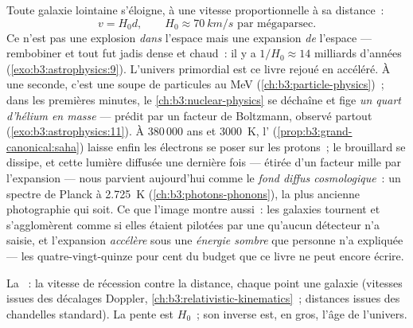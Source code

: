 \begin{definition}\label{def:b3:astrophysics:hubble}
Toute galaxie lointaine s'éloigne, à une vitesse proportionnelle à sa distance~:
\[
v = H_0d , \qquad H_0 \approx \qty{70}{km/s}
\text{ par mégaparsec} .
\]
Ce n'est pas une explosion \emph{dans} l'espace mais une expansion
\emph{de} l'espace --- rembobiner et tout fut jadis dense et chaud~:
il y a $1/H_0 \approx 14$ milliards d'années
(\cref{exo:b3:astrophysics:9}). L'univers primordial est ce livre
rejoué en accéléré. À une seconde, c'est une soupe de particules au
\unit{MeV} (\cref{ch:b3:particle-physics})~; dans les premières
minutes, le \cref{ch:b3:nuclear-physics} se déchaîne et fige
\emph{un quart d'hélium en masse} --- prédit par un facteur de
Boltzmann, observé partout
(\cref{exo:b3:astrophysics:11}). À 380\,000 ans et \qty{3000}{K},
l'
(\cref{prop:b3:grand-canonical:saha}) laisse enfin les électrons se
poser sur les protons~; le brouillard se dissipe, et cette lumière
diffusée une dernière fois --- étirée d'un facteur mille par
l'expansion --- nous parvient aujourd'hui comme le \emph{fond diffus
cosmologique}~: un spectre de Planck à \qty{2.725}{K}
(\cref{ch:b3:photons-phonons}), la plus ancienne photographie qui
soit. Ce que l'image montre aussi~: les galaxies tournent et
s'agglomèrent comme si elles étaient pilotées par une \emph{} qu'aucun détecteur n'a saisie, et l'expansion \emph{accélère}
sous une \emph{énergie sombre} que personne n'a expliquée --- les
quatre-vingt-quinze pour cent du budget que ce livre ne peut encore
écrire.
\end{definition}

\begin{omfigure}

{\small La ~: la vitesse de récession contre la
distance, chaque point une galaxie (vitesses issues des décalages
Doppler, \cref{ch:b3:relativistic-kinematics}~; distances issues des
chandelles standard). La pente est $H_0$~; son inverse est, en gros,
l'âge de l'univers.}
\end{omfigure}

